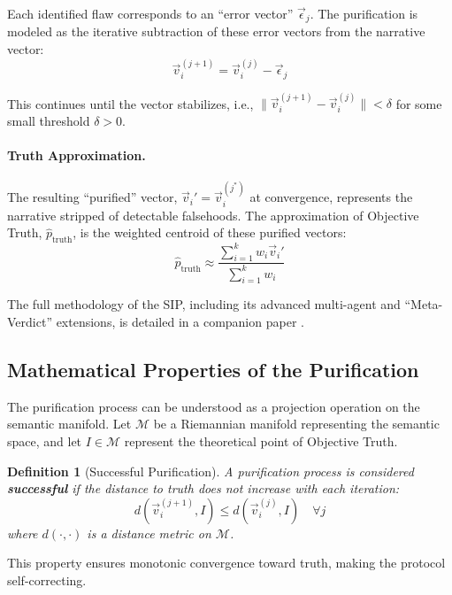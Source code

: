 \documentclass[11pt,a4paper]{article}
\newtheorem{definition}{Definition}[section]
\begin{document}
Each identified flaw corresponds to an ``error vector'' $\vec{\epsilon}_j$. The purification is modeled as the iterative subtraction of these error vectors from the narrative vector:
\begin{equation}
\vec{v}_i^{(j+1)} = \vec{v}_i^{(j)} - \vec{\epsilon}_j
\end{equation}

This continues until the vector stabilizes, i.e., $\|\vec{v}_i^{(j+1)} - \vec{v}_i^{(j)}\| < \delta$ for some small threshold $\delta > 0$.

\paragraph{Truth Approximation.} The resulting ``purified'' vector, $\vec{v}_i' = \vec{v}_i^{(j^*)}$ at convergence, represents the narrative stripped of detectable falsehoods. The approximation of Objective Truth, $\hat{p}_{\text{truth}}$, is the weighted centroid of these purified vectors:
\begin{equation}
\hat{p}_{\text{truth}} \approx \frac{\sum_{i=1}^{k} w_i \vec{v}_i'}{\sum_{i=1}^{k} w_i}
\end{equation}

The full methodology of the SIP, including its advanced multi-agent and ``Meta-Verdict'' extensions, is detailed in a companion paper \citep{Kovnatsky2025SIP}.

\subsection{Mathematical Properties of the Purification}

The purification process can be understood as a projection operation on the semantic manifold. Let $\mathcal{M}$ be a Riemannian manifold representing the semantic space, and let $I \in \mathcal{M}$ represent the theoretical point of Objective Truth.

\begin{definition}[Successful Purification]
A purification process is considered \textbf{successful} if the distance to truth does not increase with each iteration:
\begin{equation}
d(\vec{v}_i^{(j+1)}, I) \leq d(\vec{v}_i^{(j)}, I) \quad \forall j
\end{equation}
where $d(\cdot, \cdot)$ is a distance metric on $\mathcal{M}$.
\end{definition}

This property ensures monotonic convergence toward truth, making the protocol self-correcting.
\end{document}

